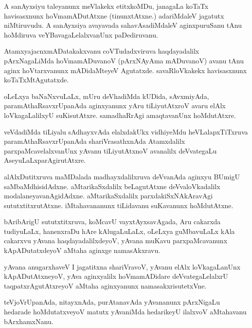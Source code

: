 \documentclass{article}
\begin{document}
\begin{mn}
A sanAyxsiyu taleyanunx meVlakekx etitxkoMDu, janagaLa koTaTx
havisasxnunx hoVmamADutAtxne (tinunxtAtxne.) adariMdaleV jagatutx
niMtiruvudu. A sanAyxsiya avayavada sahavAsadiMdaleV aginxpuruSanu
tAnu hoMdiruva veYBavagaLelalxvanUnx paDediruvanu.
\end{mn}

\begin{mn}
AtamxyajacnxmADatakakxvanu coVTudadxviruva haqdayadalilx pArxNagaLiMda
hoVmamADuvanoV (pArxNAyAma mADuvanoV) avanu tAnu aginx hoVtarxvanunx
mADidaMteyeV Agutatxde. savaRloVkakekx havisasxnunx koTaTxMtAgutatxde.
\end{mn}

\begin{mn}%
oLeLxya baNaNxvuLaLx, mUru deVhadiMda kUDida, sAvxmiyAda,
paramAthaRsavxrUpanAda aginxyanunx yAru tiLiyutAtxroV avaru elAlx
loVkagaLalilxyU suKisutAtxre. samadhaRrAgi amaqtavanUnx hoMdutAtxre.
\end{mn}

\begin{mn}
veVdadiMda tiLiyalu sAdhayxvAda elalxdakUkx vidhiyeMdu
heVLalapxTiTxruva paramAthaRsavxrUpanAda shariVrasathxnAda Atamxdalilx
parxpaMcavelalxvanUnx yAvanu tiLiyutAtxnoV avanalilx deVvategaLu AseyuLaLxparAgirutAtxre.
\end{mn}

\begin{mn}
alAlxDutitxruva maMDalada madhayxdalilxruva deVvanAda aginxyu BUmigU
saMbaMdhisidAdxne. aMtarikaSxdalilx beLagutAtxne deVvaloVkadalilx
modalaneyavanAgidAdxne. aMtarikaSxdalilx parxdakiSxNAkAravAgi
sututxtitxrutAtxne. iMtahavananunx tiLidavanu suKavanunx hoMdutAtxne.
\end{mn}

\begin{mn}
bAribArigU sututxtitxruva, koMcavU vayxtAyxsavAgada, Aru cakarxda
tudiyuLaLx, hanenxraDu hAre kAlugaLuLaLx, oLeLxya guMbavuLaLx kAla
cakarxvu yAvana haqdayadalilxdeyoV, yAvana muKavu parxpaMcavanunx
kApADutatxdeyoV aMtaha aginxge namasAkxravu.
\end{mn}

\begin{mn}
yAvana anugarxhaveV I jagatitxna shariVravoV, yAvanu elAlx
loVkagaLanUnx kApADutAtxneyoV, yAva aginxyalilx hoVmamADidare
deVvategaLelalxrU taqpatxrAgutAtxreyoV aMtaha aginxyanunx namasakxrisutetxVne.
\end{mn}

\begin{mn}
teVjoVrUpanAda, nitayxnAda, purAtanavAda yAvananunx pArxNigaLu
hedarade hoMdutatxveyoV matutx yAvaniMda hedarikeyU ilalxvoV
aMtahavanu bArxhamxNanu.
\end{mn}
\end{document}
